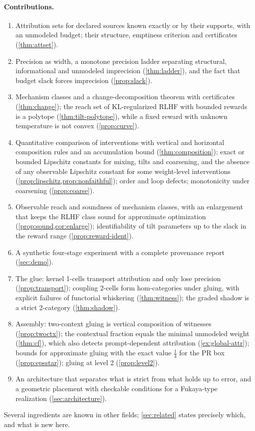 \documentclass[11pt]{article}
\theoremstyle{definition}
\theoremstyle{remark}
\begin{document}
\paragraph{Contributions.}
\begin{enumerate}[leftmargin=*]
\item Attribution sets for declared sources known exactly or by their supports, with an unmodeled
  budget; their structure, emptiness criterion and certificates (\cref{thm:attset}).
\item Precision as width, a monotone precision ladder separating structural, informational and
  unmodeled imprecision (\cref{thm:ladder}), and the fact that budget slack forces imprecision
  (\cref{prop:slack}).
\item Mechanism classes and a change-decomposition theorem with certificates (\cref{thm:change}); the
  reach set of KL-regularized RLHF with bounded rewards is a polytope (\cref{thm:tilt-polytope}),
  while a fixed reward with unknown temperature is not convex (\cref{prop:curve}).
\item Quantitative comparison of interventions with vertical and horizontal composition rules and an
  accumulation bound (\cref{thm:composition}); exact or bounded Lipschitz constants for mixing, tilts
  and coarsening, and the absence of any observable Lipschitz constant for some weight-level
  interventions (\cref{prop:lipschitz,prop:nonfaithful}); order and loop defects; monotonicity under
  coarsening (\cref{prop:coarse}).
\item Observable reach and soundness of mechanism classes, with an enlargement that keeps the RLHF
  class sound for approximate optimization (\cref{prop:sound,cor:enlarge}); identifiability of tilt
  parameters up to the slack in the reward range (\cref{prop:reward-ident}).
\item A synthetic four-stage experiment with a complete provenance report (\cref{sec:demo}).
\item The glue: kernel 1-cells transport attribution and only lose precision
  (\cref{prop:transport}); coupling 2-cells form hom-categories under gluing, with explicit failures
  of functorial whiskering (\cref{thm:witness}); the graded shadow is a strict 2-category
  (\cref{thm:shadow}).
\item Assembly: two-context gluing is vertical composition of witnesses (\cref{prop:twoctx}); the
  contextual fraction equals the minimal unmodeled weight (\cref{thm:cf}), which also detects
  prompt-dependent attribution (\cref{ex:global-attr}); bounds for approximate gluing with the exact
  value $\tfrac14$ for the PR box (\cref{prop:epsstar}); gluing at level 2 (\cref{prop:level2}).
\item An architecture that separates what is strict from what holds up to error, and a geometric
  placement with checkable conditions for a Fukaya-type realization (\cref{sec:architecture}).
\end{enumerate}
Several ingredients are known in other fields; \cref{sec:related} states precisely which, and what is
new here.
\end{document}
